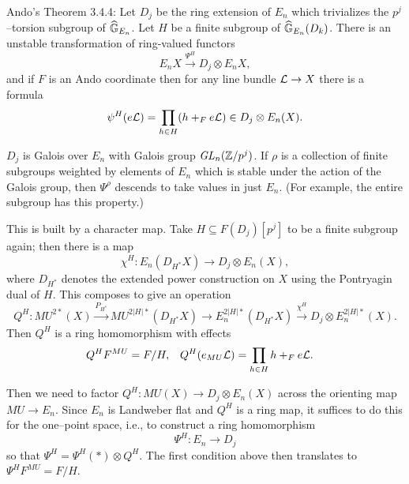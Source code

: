 

Ando's Theorem 3.4.4: Let $D_j$ be the ring extension of $E_n$ which trivializes the $p^j$--torsion subgroup of $\widehat{\mathbb G}_{E_n}$.  Let $H$ be a finite subgroup of $\widehat{\mathbb G}_{E_n}(D_k)$.  There is an unstable transformation of ring-valued functors \[E_n X \xrightarrow{\Psi^H} D_j \otimes E_n X,\] and if $F$ is an Ando coordinate then for any line bundle $\mathcal{L} \to X$ there is a formula \[\psi^H(e\mathcal{L}) = \prod_{h \in H} (h +_F e\mathcal{L}) \in D_j \otimes E_n(X).\]

$D_j$ is Galois over $E_n$ with Galois group $\mathit{GL}_n(\mathbb Z/p^j)$.  If $\rho$ is a collection of finite subgroups weighted by elements of $E_n$ which is stable under the action of the Galois group, then $\Psi^\rho$ descends to take values in just $E_n$.  (For example, the entire subgroup has this property.)

This is built by a character map.  Take $H \subseteq F(D_j)[p^j]$ to be a finite subgroup again; then there is a map \[\chi^H: E_n(D_{H^*} X) \to D_j \otimes E_n(X),\] where $D_{H^*}$ denotes the extended power construction on $X$ using the Pontryagin dual of $H$.  This composes to give an operation \[Q^H: MU^{2*}(X) \xrightarrow{P_{H^*}} MU^{2|H|*}(D_{H^*} X) \to E_n^{2|H|*}(D_{H^*} X) \xrightarrow{\chi^H} D_j \otimes E_n^{2|H|*}(X).\]  Then $Q^H$ is a ring homomorphism with effects
\begin{align*}
Q^H F^{MU} & = F/H, &
Q^H(e_{MU} \mathcal{L}) & = \prod_{h \in H} h +_F e\mathcal{L}.
\end{align*}

Then we need to factor $Q^H: MU(X) \to D_j \otimes E_n(X)$ across the orienting map $MU \to E_n$.  Since $E_n$ is Landweber flat and $Q^H$ is a ring map, it suffices to do this for the one--point space, i.e., to construct a ring homomorphism \[\Psi^H: E_n \to D_j\] so that $\Psi^H = \Psi^H(*) \otimes Q^H$.  The first condition above then translates to $\Psi^H F^{MU} = F/H$.


